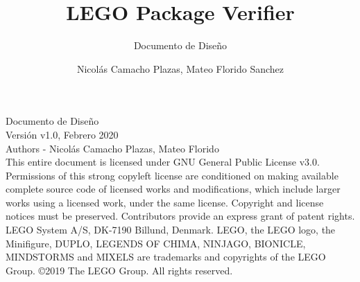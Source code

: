 \documentclass[letterpaper]{scrreprt}
\title{LEGO Package Verifier}
\subtitle{Documento de Diseño}
\author{Nicolás Camacho Plazas, Mateo Florido Sanchez}
\begin{document}
\restoregeometry %
\nopagecolor%

\maketitle
\noindent
Documento de Diseño\\ 
Versión v1.0, Febrero 2020\\
Authors - Nicolás Camacho Plazas, Mateo Florido\\
This entire document is licensed under GNU General Public License v3.0. Permissions of this strong copyleft license are conditioned on making available complete source code of licensed works and modifications, which include larger works using a licensed work, under the same license. Copyright and license notices must be preserved. Contributors provide an express grant of patent rights.\\
LEGO System A/S, DK-7190 Billund, Denmark. LEGO, the LEGO logo, the Minifigure, DUPLO, LEGENDS OF CHIMA, NINJAGO, BIONICLE, MINDSTORMS and MIXELS are trademarks and copyrights of the LEGO Group. ©2019 The LEGO Group. All rights reserved.

\newpage

\tableofcontents

\end{document}
